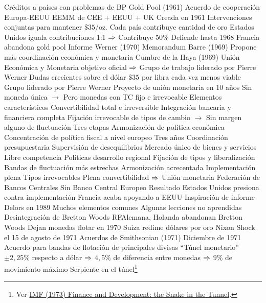 \documentclass{nuevotema}
\begin{document}
\begin{esquemal}
				\4[] Créditos a países con problemas de BP
			\3 Gold Pool (1961)
				\4 Acuerdo de cooperación Europa-EEUU
				\4 EEMM de CEE + EEUU + UK
				\4 Creada en 1961
				\4 Intervenciones conjuntas para mantener $\$35$/oz.
				\4 Cada país contribuye cantidad de oro
				\4[] Estados Unidos iguala contribuciones 1:1
				\4[] $\Rightarrow$ Contribuye 50\%
				\4 Defiende hasta 1968
				\4[] Francia abandona gold pool
			\3 Informe Werner (1970)
				\4 Memorandum Barre (1969)
				\4[] Propone más coordinación económica y monetaria
				\4 Cumbre de la Haya (1969)
				\4[] Unión Económica y Monetaria objetivo oficial
				\4[] $\Rightarrow$ Grupo de trabajo liderado por Pierre Werner
				\4 Dudas crecientes sobre el dólar
				\4[] $\$35$ por libra cada vez menos viable
				\4 Grupo liderado por Pierre Werner
				\4 Proyecto de unión monetaria en 10 años
				\4[] Sin moneda única
				\4[] $\to$ Pero monedas con TC fijo e irrevocable
				\4 Elementos característicos
				\4[] Convertibilidad total e irreversible
				\4[] Integración bancaria y financiera completa
				\4[] Fijación irrevocable de tipos de cambio
				\4[] $\to$ Sin margen alguno de fluctuación
				\4 Tres etapas
				\4[I] Armonización de política económica
				\4[] Concentración de política fiscal a nivel europeo
				\4[] Tres años
				\4[] Coordinación presupuestaria
				\4[] Supervisión de desequilibrios
				\4[] Mercado único de bienes y servicios
				\4[] Libre competencia
				\4[] Políticas desarrollo regional
				\4[II] Fijación de tipos y liberalización
				\4[] Bandas de fluctuación más estrechas
				\4[] Armonización acrecentada
				\4[III] Implementación plena
				\4[] Tipos irrevocables
				\4[] Plena convertibilidad
				\4[] $\Rightarrow$ Unión monetaria
				\4 Federación de Bancos Centrales
				\4[] Sin Banco Central Europeo
				\4 Resultado
				\4[] Estados Unidos presiona contra implementación
				\4[] Francia acaba apoyando a EEUU
				\4 Inspiración de informe Delors en 1989
				\4[] Muchos elementos comunes
				\4[] Algunas lecciones no aprendidas
			\3 Desintegración de Bretton Woods
				\4 RFAlemana, Holanda abandonan Bretton Woods
				\4[] Dejan monedas flotar en 1970
				\4 Suiza redime dólares por oro
				\4 Nixon Shock el 15 de agosto de 1971
			\3 Acuerdos de Smithsonian (1971)
				\4 Diciembre de 1971
				\4 Acuerdo para bandas de flotación de principales divisas
				\4[] ``Túnel monetario''
				\4[] $\pm 2,25\%$ respecto a dólar
				\4[] $\Rightarrow$ $4,5\%$ de diferencia entre monedas
				\4[] $\Rightarrow$ $9\%$ de movimiento máximo
			\3 Serpiente en el túnel\footnote{Ver \href{https://www.elibrary.imf.org/view/IMF022/12444-9781616353124/12444-9781616353124/12444-9781616353124_A002.xml?language=en&redirect=true}{IMF (1973) Finance and Development: the Snake in the Tunnel}.}

\end{esquemal}
\end{document}

